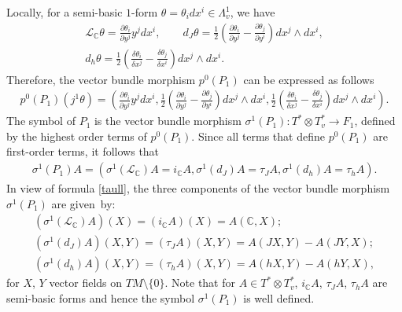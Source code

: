 Locally, for a semi-basic $1$-form $\theta=\theta_idx^i\in
\Lambda^1_v$, we have
\begin{gather*}
\mathcal{L}_{\mathbb C}\theta=\frac{\partial \theta_i}{\partial
  y^j}y^jdx^i, \qquad d_J\theta = \frac{1}{2}\left(\frac{\partial
\theta_i}{\partial y^j}-\frac{\partial \theta_j}{\partial
y^i}\right)dx^j\wedge dx^i, \\ d_h\theta = \frac{1}{2}\left(\frac{\delta \theta_i}{\delta x^j}-
\frac{\delta \theta_j}{\delta x^i} \right) dx^j\wedge dx^i.
\end{gather*}
Therefore, the vector bundle morphism $p^0(P_1)$ can be expressed as
follows
\begin{gather*}
p^0(P_1)(j^1\theta)= \left(\frac{\partial
\theta_i}{\partial y^j}y^j dx^i, \frac{1}{2}\left(\frac{\partial
\theta_i}{\partial y^j}-\frac{\partial \theta_j}{\partial
y^i}\right) dx^j\wedge dx^i, \frac{1}{2}\left(\frac{\delta \theta_i}{\delta x^j}-
\frac{\delta \theta_j}{\delta x^i}\right) dx^j\wedge dx^i \right).
\end{gather*} The symbol
of $P_1$ is the vector bundle morphism $\sigma^1(P_1): T^*\otimes
T^*_v \to F_1$, def\/ined by the highest order terms of $p^0(P_1)$.
Since all terms that def\/ine $p^0(P_1)$ are f\/irst-order terms,
it follows that
\begin{gather} \sigma^1(P_1)A=\left(
\sigma^1\left(\mathcal{L}_{\mathbb C}\right)A=i_{\mathbb{C}}A,
\sigma^1\left(d_J\right)A=\tau_JA,
\sigma^1\left(d_h\right)A=\tau_hA\right). \label{sigma1p1}
\end{gather}
In view of formula \eqref{taull}, the three components of the vector
bundle morphism $\sigma^1(P_1)$ are given~by:
\begin{gather*}
\left( \sigma^1\left(\mathcal{L}_{\mathbb C}\right)A\right) (X)
 = \left( i_{\mathbb{C}}A\right)(X)=A(\mathbb{C}, X); \\
\left(\sigma^1\left(d_J\right)A\right)(X,Y) = \left(\tau_JA\right)(X,Y)
= A(JX,Y)-A(JY, X); \\
\left(\sigma^1\left(d_h\right)A\right)(X,Y) = \left(\tau_hA\right)(X,Y)
= A(hX,Y)-A(hY, X),
\end{gather*} for $X$, $Y$ vector f\/ields on $TM\setminus\{0\}$.
Note that for $A\in T^*\otimes T^*_v$, $i_{\mathbb{C}}A$, $\tau_JA$,
$\tau_hA$ are semi-basic forms and hence the symbol $\sigma^1(P_1)$ is well
def\/ined.

